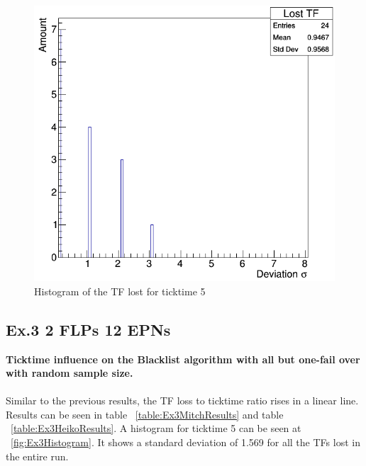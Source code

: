 \newpage

\begin{figure}[h!]
	\centering
	\includegraphics[scale=0.5]{./graphics/ex2_histogram.png}
	\caption{Histogram of the TF lost for ticktime 5}
	\label{Ex2Histogram}
\end{figure}

\newpage

\subsection*{Ex.3 2 FLPs 12 EPNs}
\textbf{Ticktime influence on the Blacklist algorithm with all but one-fail over with random sample size.}
\\~\\
Similar to the previous results, the TF loss to ticktime ratio rises in a linear line. Results can be seen in table ~\ref{table:Ex3MitchResults} and table ~\ref{table:Ex3HeikoResults}. A histogram for ticktime 5 can be seen at ~\ref{fig:Ex3Histogram}. It shows a standard deviation of 1.569 for all the TFs lost in the entire run. 


